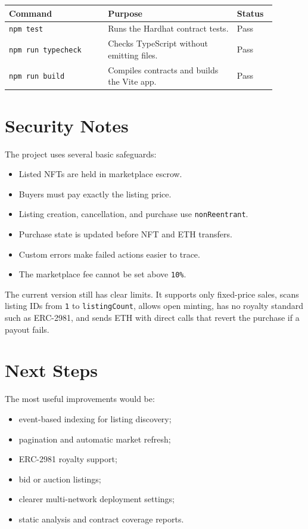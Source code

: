 \documentclass[11pt,a4paper]{article}
\newcommand{\code}[1]{\texttt{#1}}
\begin{document}
\begin{longtable}{p{0.33\linewidth} p{0.43\linewidth} p{0.13\linewidth}}
\toprule
\textbf{Command} & \textbf{Purpose} & \textbf{Status} \\
\midrule
\endhead
\code{npm test} & Runs the Hardhat contract tests. & Pass \\
\code{npm run typecheck} & Checks TypeScript without emitting files. & Pass \\
\code{npm run build} & Compiles contracts and builds the Vite app. & Pass \\
\bottomrule
\end{longtable}

\section{Security Notes}

The project uses several basic safeguards:

\begin{itemize}
    \item Listed NFTs are held in marketplace escrow.
    \item Buyers must pay exactly the listing price.
    \item Listing creation, cancellation, and purchase use \code{nonReentrant}.
    \item Purchase state is updated before NFT and ETH transfers.
    \item Custom errors make failed actions easier to trace.
    \item The marketplace fee cannot be set above \code{10\%}.
\end{itemize}

The current version still has clear limits. It supports only fixed-price sales, scans listing IDs from \code{1} to \code{listingCount}, allows open minting, has no royalty standard such as ERC-2981, and sends ETH with direct calls that revert the purchase if a payout fails.

\section{Next Steps}

The most useful improvements would be:

\begin{itemize}
    \item event-based indexing for listing discovery;
    \item pagination and automatic market refresh;
    \item ERC-2981 royalty support;
    \item bid or auction listings;
    \item clearer multi-network deployment settings;
    \item static analysis and contract coverage reports.
\end{itemize}
\end{document}
